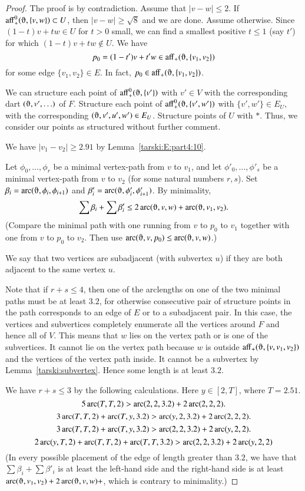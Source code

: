 \begin{proof}
The proof is by contradiction.  Assume that $|v-w|\le 2$.
If $\op{aff}_+^0(\orgn,\{v,w\})\subset U$, then $|v-w|\ge\sqrt8$ and
we are done.  Assume otherwise.  Since $(1-t)v + t w\in U$ for $t>0$
small, we can find a smallest positive $t\le 1$ (say $t'$) for which
$(1-t)v + t w\not\in U$.  We have
$$p_0 = (1-t') v + t' w \in \op{aff}_+(\orgn,\{v_1,v_2\})$$
for some edge $\{v_1,v_2\}\in E$.  
In fact, $p_0\in \op{aff}_+(\orgn,\{v_1,v_2\})$.

We can structure each point of $\op{aff}^0_+(\orgn,\{v'\})$ with
$v'\in V$ with the corresponding dart $(\orgn,v',\ldots)$ of $F$.
Structure each point of $\op{aff}_+^0(\orgn,\{v',w'\})$ with
$\{v',w'\}\in E_U$, with the corresponding $(\orgn,v',u',w')\in E_U$.
Structure points of $U$ with $*$. Thus, we consider our points as
structured without further comment.


We have $|v_1-v_2|\ge2.91$ by Lemma~\ref{tarski:E:part4:10}.

Let $\phi_0,\ldots,\phi_r$ be a minimal vertex-path from $v$ to
$v_1$, and let $\phi'_0,\ldots,\phi'_s$ be a minimal vertex-path from
$v$ to $v_2$ (for some natural numbers $r,s$). 
Set $\beta_i = \arc(\orgn,\phi_i,\phi_{i+1})$ and
$\beta'_i = \arc(\orgn,\phi'_i,\phi'_{i+1})$.
By minimality, 
  $$
   \sum \beta_i + \sum \beta'_i \le 2 \arc(\orgn,v,w) + \arc(\orgn,v_1,v_2).
  $$
(Compare the minimal path with one running from $v$ to $p_0$ to $v_1$
together with one from $v$ to $p_0$ to $v_2$. Then use $\arc(\orgn,v,p_0)\le
\arc(\orgn,v,w)$.)

We say that two vertices are subadjacent (with subvertex $u$)
if they are both adjacent
to the same vertex $u$.

Note that if $r+s\le4$, then one of the arclengths on one of the two minimal paths
must be at
least $3.2$, for otherwise consecutive pair of structure points
in the path corresponds to
an 
edge of $E$ or to a subadjacent pair. 
In this case, the vertices and subvertices completely enumerate
all the vertices around $F$ and hence all of $V$.  This means that
$w$ lies on the vertex path or is one of the subvertices.  It
cannot lie on the vertex path because $w$ is outside $\op{aff}_+(\orgn,
\{v,v_1,v_2\})$ and the vertices of the vertex path inside.
It cannot be a subvertex by Lemma~\ref{tarski:subvertex}.
Hence some length is at least $3.2$.

We have $r+s\le3$ by the following calculations.  Here
$y\in[2,T]$, where $T=2.51$.
    $$5\operatorname{arc}(T,T,2) > \operatorname{arc}(2,2,3.2)+ 2 \operatorname{arc}(2,2,2).$$
    $$3\operatorname{arc}(T,T,2) + \operatorname{arc}(T,y,3.2) > \operatorname{arc}(y,2,3.2) + 2 \operatorname{arc}(2,2,2).$$
    $$3\operatorname{arc}(T,T,2) + \operatorname{arc}(T,y,3.2) > \operatorname{arc}(2,2,3.2) + 2\operatorname{arc}(y,2,2).$$
    $$2\operatorname{arc}(y,T,2) + \operatorname{arc}(T,T,2) + \operatorname{arc}(T,T,3.2) > \operatorname{arc}(2,2,3.2) + 2\operatorname{arc}(y,2,2) $$
(In every possible placement of the edge of length greater than $3.2$,
we have that $\sum \beta_i + \sum\beta'_i$ is at least the left-hand side
and the right-hand side is at least $\arc(\orgn,v_1,v_2)+2\arc(\orgn,v,w)+$,
which is contrary to minimality.)


\end{proof}

